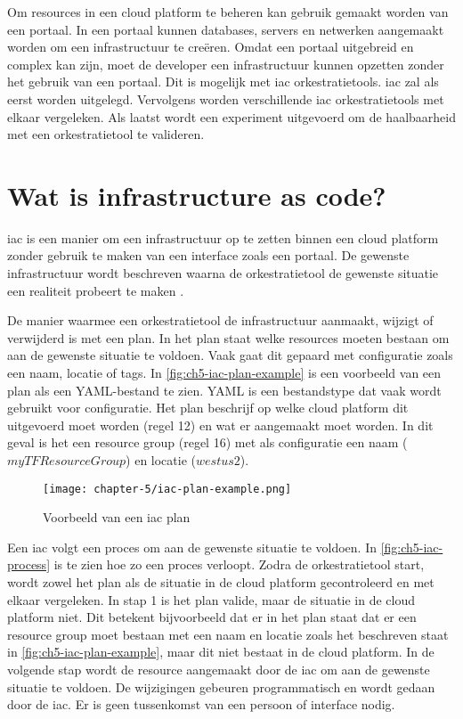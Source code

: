 Om resources in een cloud platform te beheren kan gebruik gemaakt worden van een portaal. In een portaal kunnen databases, servers en netwerken aangemaakt worden om een infrastructuur te creëren. Omdat een portaal uitgebreid en complex kan zijn, moet de developer een infrastructuur kunnen opzetten zonder het gebruik van een portaal. Dit is mogelijk met \acrfull{iac} orkestratietools. \Acrshort{iac} zal als eerst worden uitgelegd. Vervolgens worden verschillende \Acrshort{iac} orkestratietools met elkaar vergeleken. Als laatst wordt een experiment uitgevoerd om de haalbaarheid met een orkestratietool te valideren.

\section{Wat is infrastructure as code?}\label{subsec:ch5-wat-is-infrastructure-as-code}
\acrshort{iac} is een manier om een infrastructuur op te zetten binnen een cloud platform zonder gebruik te maken van een interface zoals een portaal. De gewenste infrastructuur wordt beschreven waarna de orkestratietool de gewenste situatie een realiteit probeert te maken \cite{iac-amazon-web-services-in-action}.

De manier waarmee een orkestratietool de infrastructuur aanmaakt, wijzigt of verwijderd is met een plan. In het plan staat welke resources moeten bestaan om aan de gewenste situatie te voldoen. Vaak gaat dit gepaard met configuratie zoals een naam, locatie of tags. In \autoref{fig:ch5-iac-plan-example} is een voorbeeld van een plan als een YAML-bestand te zien. YAML is een bestandstype dat vaak wordt gebruikt voor configuratie. Het plan beschrijf op welke cloud platform dit uitgevoerd moet worden (regel 12) en wat er aangemaakt moet worden. In dit geval is het een resource group (regel 16) met als configuratie een naam (\(myTFResourceGroup\)) en locatie (\(westus2\)).

\begin{figure}[hbt!]
  \centering
  \texttt{[image: chapter-5/iac-plan-example.png]}
  \caption{Voorbeeld van een \acrfull{iac} plan \cite{terraform-plan-example}}
  \label{fig:ch5-iac-plan-example}
\end{figure}

Een \Acrshort{iac} volgt een proces om aan de gewenste situatie te voldoen. In \autoref{fig:ch5-iac-process} is te zien hoe zo een proces verloopt. Zodra de orkestratietool start, wordt zowel het plan als de situatie in de cloud platform gecontroleerd en met elkaar vergeleken. In stap 1 is het plan valide, maar de situatie in de cloud platform niet. Dit betekent bijvoorbeeld dat er in het plan staat dat er een resource group moet bestaan met een naam en locatie zoals het beschreven staat in \autoref{fig:ch5-iac-plan-example}, maar dit niet bestaat in de cloud platform. In de volgende stap wordt de resource aangemaakt door de \Acrshort{iac} om aan de gewenste situatie te voldoen. De wijzigingen gebeuren programmatisch en wordt gedaan door de \Acrshort{iac}. Er is geen tussenkomst van een persoon of interface nodig. 

